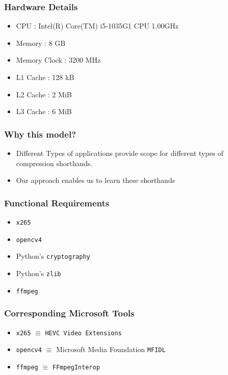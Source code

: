 \documentclass{beamer}
\begin{document}
\begin{frame}
    \frametitle{Hardware Details}
    \begin{itemize}
        \item CPU : Intel(R) Core(TM) i5-1035G1 CPU \@ 1.00GHz

        \item Memory : 8 GB
        \item Memory Clock : 3200 MHz
        \item L1 Cache : 128 kB
        \item L2 Cache : 2 MiB
        \item L3 Cache : 6 MiB
    \end{itemize}
\end{frame}

\begin{frame}
    \frametitle{Why this model?}
    \begin{itemize}
        \item Different Types of applications provide scope for different types of compression shorthands.
        \pause
        \item Our approach enables us to learn these shorthands
    \end{itemize}
\end{frame}

\begin{frame}
    \frametitle{Functional Requirements}
    \begin{itemize}
        \item \texttt{x265}
        \item \texttt{opencv4}
        \item Python's \texttt{cryptography}
        \item Python's \texttt{zlib}
        \item \texttt{ffmpeg}
    \end{itemize}
\end{frame}


\begin{frame}
    \frametitle{Corresponding Microsoft Tools}
    \begin{itemize}
        \item \texttt{x265} $\equiv$ \texttt{HEVC Video Extensions}
        \pause
        \item \texttt{opencv4} $\equiv$ Microsoft Media Foundation \texttt{MFIDL}
        \pause
        \item \texttt{ffmpeg} $\equiv$ \texttt{FFmpegInterop}
    \end{itemize}
\end{frame}
\end{document}
